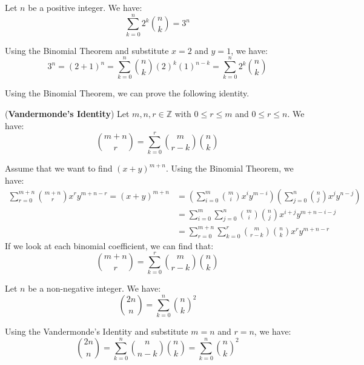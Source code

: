 \documentclass{huhtakm-template-book}
\begin{document}
\begin{cor}
	Let $n$ be a positive integer. We have:
	\begin{equation*}
		\sum_{k=0}^{n}2^{k}\binom{n}{k}=3^{n}
	\end{equation*}
\end{cor}
\begin{proofing}
	Using the Binomial Theorem and substitute $x=2$ and $y=1$, we have:
	\begin{equation*}
		3^{n}=(2+1)^{n}=\sum_{k=0}^{n}\binom{n}{k}(2)^{k}(1)^{n-k}=\sum_{k=0}^{n}2^{k}\binom{n}{k}
	\end{equation*}
\end{proofing}
\newpage

Using the Binomial Theorem, we can prove the following identity.
\begin{thm}(\textbf{Vandermonde's Identity})
	\label{Vandermonde's Identity (Theorem)}
	Let $m,n,r\in\mathbb{Z}$ with $0\leq r\leq m$ and $0\leq r\leq n$. We have:
	\begin{equation*}
		\binom{m+n}{r}=\sum_{k=0}^{r}\binom{m}{r-k}\binom{n}{k}
	\end{equation*}
\end{thm}
\begin{proofing}
	Assume that we want to find $(x+y)^{m+n}$. Using the Binomial Theorem, we have:
	\begin{align*}
		\sum_{r=0}^{m+n}\binom{m+n}{r}x^{r}y^{m+n-r}=(x+y)^{m+n}&=\left(\sum_{i=0}^{m}\binom{m}{i}x^{i}y^{m-i}\right)\left(\sum_{j=0}^{n}\binom{n}{j}x^{j}y^{n-j}\right)\\
		&=\sum_{i=0}^{m}\sum_{j=0}^{n}\binom{m}{i}\binom{n}{j}x^{i+j}y^{m+n-i-j}\\
		\tag{Setting $r=i+j$ and $k=j$}
		&=\sum_{r=0}^{m+n}\sum_{k=0}^{r}\binom{m}{r-k}\binom{n}{k}x^{r}y^{m+n-r}
	\end{align*}
	If we look at each binomial coefficient, we can find that:
	\begin{equation*}
		\binom{m+n}{r}=\sum_{k=0}^{r}\binom{m}{r-k}\binom{n}{k}
	\end{equation*}
\end{proofing}
\begin{cor}
	Let $n$ be a non-negative integer. We have:
	\begin{equation*}
		\binom{2n}{n}=\sum_{k=0}^{n}\binom{n}{k}^{2}
	\end{equation*}
\end{cor}
\begin{proofing}
	Using the Vandermonde's Identity and substitute $m=n$ and $r=n$, we have:
	\begin{equation*}
		\binom{2n}{n}=\sum_{k=0}^{n}\binom{n}{n-k}\binom{n}{k}=\sum_{k=0}^{n}\binom{n}{k}^{2}
	\end{equation*}
\end{proofing}
\end{document}
